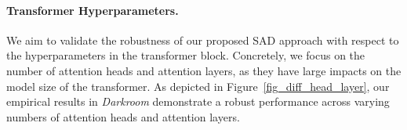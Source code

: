 


\paragraph{Transformer Hyperparameters.}
%
We aim to validate the robustness of our proposed SAD approach with respect to the hyperparameters in the transformer block. Concretely, we focus on the number of attention heads and attention layers, as they have large impacts on the model size of the transformer. As depicted in Figure~\ref{fig_diff_head_layer}, our empirical results in \textit{Darkroom} demonstrate a robust performance across varying numbers of attention heads and attention layers.





